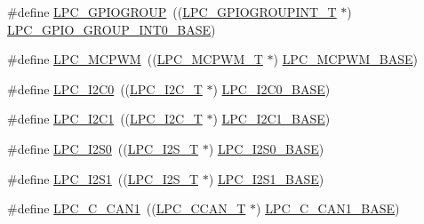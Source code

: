 \begin{DoxyCompactItemize}
\item 
\#define \hyperlink{group___p_e_r_i_p_h__43_x_x___b_a_s_e_gab6060ccc34c97651f9f8baf8f75a98ea}{L\+P\+C\+\_\+\+G\+P\+I\+O\+G\+R\+O\+UP}~((\hyperlink{struct_l_p_c___g_p_i_o_g_r_o_u_p_i_n_t___t}{L\+P\+C\+\_\+\+G\+P\+I\+O\+G\+R\+O\+U\+P\+I\+N\+T\+\_\+T}     $\ast$) \hyperlink{group___p_e_r_i_p_h__43_x_x___b_a_s_e_ga4bb8560e4125ff2b4dca337887316977}{L\+P\+C\+\_\+\+G\+P\+I\+O\+\_\+\+G\+R\+O\+U\+P\+\_\+\+I\+N\+T0\+\_\+\+B\+A\+SE})
\item 
\#define \hyperlink{group___p_e_r_i_p_h__43_x_x___b_a_s_e_ga6fe8e415821195a786b3f0dc5e7fc9fa}{L\+P\+C\+\_\+\+M\+C\+P\+WM}~((\hyperlink{struct_l_p_c___m_c_p_w_m___t}{L\+P\+C\+\_\+\+M\+C\+P\+W\+M\+\_\+T}            $\ast$) \hyperlink{group___p_e_r_i_p_h__43_x_x___b_a_s_e_gad8a41dc802e3ea0ba9457d42a6927c03}{L\+P\+C\+\_\+\+M\+C\+P\+W\+M\+\_\+\+B\+A\+SE})
\item 
\#define \hyperlink{group___p_e_r_i_p_h__43_x_x___b_a_s_e_ga14b6c56857e970a682a9bb22a0cb6716}{L\+P\+C\+\_\+\+I2\+C0}~((\hyperlink{struct_l_p_c___i2_c___t}{L\+P\+C\+\_\+\+I2\+C\+\_\+T}              $\ast$) \hyperlink{group___p_e_r_i_p_h__43_x_x___b_a_s_e_gab4476c9e874621194369f74fcf26ce92}{L\+P\+C\+\_\+\+I2\+C0\+\_\+\+B\+A\+SE})
\item 
\#define \hyperlink{group___p_e_r_i_p_h__43_x_x___b_a_s_e_gad6d6333e47875813be171cffef258837}{L\+P\+C\+\_\+\+I2\+C1}~((\hyperlink{struct_l_p_c___i2_c___t}{L\+P\+C\+\_\+\+I2\+C\+\_\+T}              $\ast$) \hyperlink{group___p_e_r_i_p_h__43_x_x___b_a_s_e_gae59f73cf24ff126be3b9a8b921926676}{L\+P\+C\+\_\+\+I2\+C1\+\_\+\+B\+A\+SE})
\item 
\#define \hyperlink{group___p_e_r_i_p_h__43_x_x___b_a_s_e_ga4887dae88a015542b54639daf8ec5f61}{L\+P\+C\+\_\+\+I2\+S0}~((\hyperlink{struct_l_p_c___i2_s___t}{L\+P\+C\+\_\+\+I2\+S\+\_\+T}              $\ast$) \hyperlink{group___p_e_r_i_p_h__43_x_x___b_a_s_e_gae77fe89f0abd4b4b73de7ab5adc822f5}{L\+P\+C\+\_\+\+I2\+S0\+\_\+\+B\+A\+SE})
\item 
\#define \hyperlink{group___p_e_r_i_p_h__43_x_x___b_a_s_e_ga9bb3d01c98234fe6e7d12d171fe283b2}{L\+P\+C\+\_\+\+I2\+S1}~((\hyperlink{struct_l_p_c___i2_s___t}{L\+P\+C\+\_\+\+I2\+S\+\_\+T}              $\ast$) \hyperlink{group___p_e_r_i_p_h__43_x_x___b_a_s_e_gad2702d06c20bbf06f072e29ec173e4ab}{L\+P\+C\+\_\+\+I2\+S1\+\_\+\+B\+A\+SE})
\item 
\#define \hyperlink{group___p_e_r_i_p_h__43_x_x___b_a_s_e_gaf34264b6322506295cc7b7e1ac903148}{L\+P\+C\+\_\+\+C\+\_\+\+C\+A\+N1}~((\hyperlink{struct_l_p_c___c_c_a_n___t}{L\+P\+C\+\_\+\+C\+C\+A\+N\+\_\+T}             $\ast$) \hyperlink{group___p_e_r_i_p_h__43_x_x___b_a_s_e_ga4715c87f8d58d962b5fa3d4e23e06328}{L\+P\+C\+\_\+\+C\+\_\+\+C\+A\+N1\+\_\+\+B\+A\+SE})

\end{DoxyCompactItemize}
